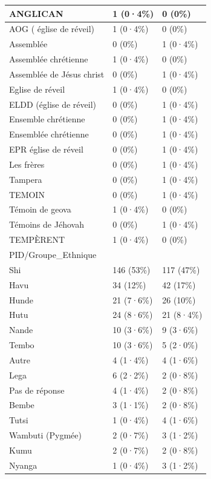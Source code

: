 \documentclass[
]{book}
\begin{document}
\begin{tabular}{l|l|l}
\hline
ANGLICAN & 1 (0·4\%) & 0 (0\%)\\
\hline
AOG  ( église de réveil) & 1 (0·4\%) & 0 (0\%)\\
\hline
Assemblée & 0 (0\%) & 1 (0·4\%)\\
\hline
Assemblée chrétienne & 1 (0·4\%) & 0 (0\%)\\
\hline
Assemblée de Jésus christ & 0 (0\%) & 1 (0·4\%)\\
\hline
Eglise de réveil & 1 (0·4\%) & 0 (0\%)\\
\hline
ELDD (église de réveil) & 0 (0\%) & 1 (0·4\%)\\
\hline
Ensemble chrétienne & 0 (0\%) & 1 (0·4\%)\\
\hline
Ensemblée chrétienne & 0 (0\%) & 1 (0·4\%)\\
\hline
EPR église de réveil & 0 (0\%) & 1 (0·4\%)\\
\hline
Les frères & 0 (0\%) & 1 (0·4\%)\\
\hline
Tampera & 0 (0\%) & 1 (0·4\%)\\
\hline
TEMOIN & 0 (0\%) & 1 (0·4\%)\\
\hline
Témoin de geova & 1 (0·4\%) & 0 (0\%)\\
\hline
Témoins de Jéhovah & 0 (0\%) & 1 (0·4\%)\\
\hline
TEMPÈRENT & 1 (0·4\%) & 0 (0\%)\\
\hline
PID/Groupe\_Ethnique &  & \\
\hline
Shi & 146 (53\%) & 117 (47\%)\\
\hline
Havu & 34 (12\%) & 42 (17\%)\\
\hline
Hunde & 21 (7·6\%) & 26 (10\%)\\
\hline
Hutu & 24 (8·6\%) & 21 (8·4\%)\\
\hline
Nande & 10 (3·6\%) & 9 (3·6\%)\\
\hline
Tembo & 10 (3·6\%) & 5 (2·0\%)\\
\hline
Autre & 4 (1·4\%) & 4 (1·6\%)\\
\hline
Lega & 6 (2·2\%) & 2 (0·8\%)\\
\hline
Pas de réponse & 4 (1·4\%) & 2 (0·8\%)\\
\hline
Bembe & 3 (1·1\%) & 2 (0·8\%)\\
\hline
Tutsi & 1 (0·4\%) & 4 (1·6\%)\\
\hline
Wambuti (Pygmée) & 2 (0·7\%) & 3 (1·2\%)\\
\hline
Kumu & 2 (0·7\%) & 2 (0·8\%)\\
\hline
Nyanga & 1 (0·4\%) & 3 (1·2\%)\\

\end{tabular}
\end{document}
